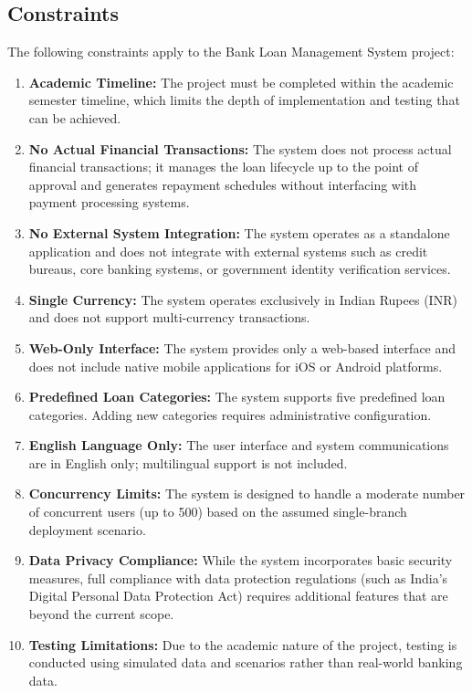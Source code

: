 \subsection{Constraints}

The following constraints apply to the Bank Loan Management System project:

\begin{enumerate}
  \item \textbf{Academic Timeline:} The project must be completed within the academic semester timeline, which limits the depth of implementation and testing that can be achieved.
  \item \textbf{No Actual Financial Transactions:} The system does not process actual financial transactions; it manages the loan lifecycle up to the point of approval and generates repayment schedules without interfacing with payment processing systems.
  \item \textbf{No External System Integration:} The system operates as a standalone application and does not integrate with external systems such as credit bureaus, core banking systems, or government identity verification services.
  \item \textbf{Single Currency:} The system operates exclusively in Indian Rupees (INR) and does not support multi-currency transactions.
  \item \textbf{Web-Only Interface:} The system provides only a web-based interface and does not include native mobile applications for iOS or Android platforms.
  \item \textbf{Predefined Loan Categories:} The system supports five predefined loan categories. Adding new categories requires administrative configuration.
  \item \textbf{English Language Only:} The user interface and system communications are in English only; multilingual support is not included.
  \item \textbf{Concurrency Limits:} The system is designed to handle a moderate number of concurrent users (up to 500) based on the assumed single-branch deployment scenario.
  \item \textbf{Data Privacy Compliance:} While the system incorporates basic security measures, full compliance with data protection regulations (such as India's Digital Personal Data Protection Act) requires additional features that are beyond the current scope.
  \item \textbf{Testing Limitations:} Due to the academic nature of the project, testing is conducted using simulated data and scenarios rather than real-world banking data.
\end{enumerate}
